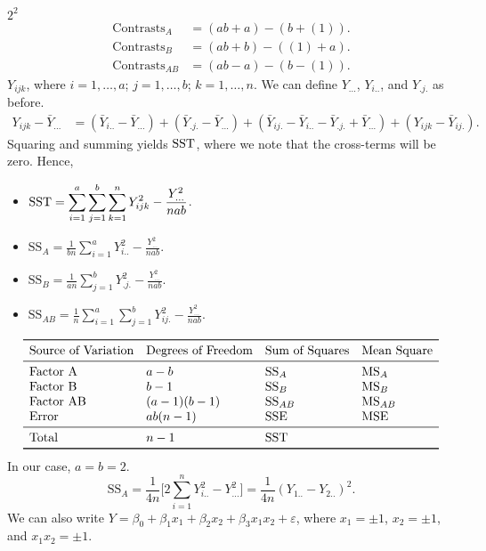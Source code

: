 \begin{Example}{$ 2^2 $}{}
    \begin{align*}
        \text{Contrasts}_{A}  & =(ab+a)-(b+(1)). \\
        \text{Contrasts}_B    & =(ab+b)-((1)+a). \\
        \text{Contrasts}_{AB} & =(ab-a)-(b-(1)).
    \end{align*}
    $ Y_{ijk} $, where $ i=1,\ldots,a $; $ j=1,\ldots,b $; $ k=1,\ldots,n $.
    We can define $ Y_{...} $, $ Y_{i..} $, and $ Y_{.j.} $ as before.
    \begin{align*}
        Y_{ijk}-\bar{Y}_{...}
         & =(\bar{Y}_{i..}-\bar{Y}_{...})+(\bar{Y}_{.j.}-\bar{Y}_{...})
        +(\bar{Y}_{ij.}-\bar{Y}_{i..}-\bar{Y}_{.j.}+\bar{Y}_{...})+(Y_{ijk}-\bar{Y}_{ij.}).
    \end{align*}
    Squaring and summing yields $ \text{SST} $, where we note that the cross-terms will be zero. Hence,
    \begin{itemize}
        \item $ \displaystyle \text{SST}=\sum_{i=1}^{a}\sum_{j=1}^{b}\sum_{k=1}^{n}Y_{ijk}^2-\frac{Y_{...}^2}{nab} $.
        \item $ \displaystyle \text{SS}_A=\frac{1}{bn}\sum_{i=1}^{a}Y_{i..}^2-\frac{Y_{...}^2}{nab} $.
        \item $ \displaystyle \text{SS}_B=\frac{1}{an}\sum_{j=1}^{b}Y_{.j.}^2-\frac{Y_{...}^2}{nab} $.
        \item $ \displaystyle \text{SS}_{AB}=\frac{1}{n}\sum_{i=1}^{a}\sum_{j=1}^{b}Y_{ij.}^2-\frac{Y_{...}^2}{nab} $.
    \end{itemize}
    \[ \begin{array}{llll}
            \toprule
            \text{Source of Variation} & \text{Degrees of Freedom} & \text{Sum of Squares} & \text{Mean Square} \\
            \midrule
            \text{Factor A}            & a-b                       & \text{SS}_A           & \text{MS}_A        \\
            \text{Factor B}            & b-1                       & \text{SS}_B           & \text{MS}_B        \\
            \text{Factor AB}           & (a-1)(b-1)                & \text{SS}_{AB}        & \text{MS}_{AB}     \\
            \text{Error}               & ab(n-1)                   & \SSE                  & \MSE               \\
            \midrule
            \text{Total}               & n-1                       & \SST                                       \\
            \bottomrule
        \end{array} \]
    In our case, $ a=b=2 $.
    \[ \text{SS}_A=\frac{1}{4n}\biggl[2 \sum_{i=1}^{n}Y_{i..}^2-Y_{...}^2\biggr]
        =\frac{1}{4n}(Y_{1..}-Y_{2..})^2. \]
    We can also write $ Y=\beta_0+\beta_1 x_1+\beta_2 x_2+\beta_3 x_1 x_2+\varepsilon $,
    where $ x_1=\pm 1 $, $ x_2=\pm 1 $, and $ x_1 x_2=\pm 1 $.
\end{Example}
